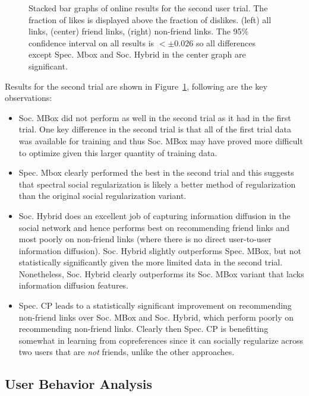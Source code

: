 \begin{figure}[t!]
\caption{Stacked bar graphs of online results for the second
user trial.  The fraction of likes is displayed above 
the fraction of dislikes.  (left) all links, (center) friend links,
(right) non-friend links. The 95\% confidence interval on all 
results is $< \pm 0.026$ so all differences except Spec. Mbox
and Soc. Hybrid in the center graph are significant. }
\label{fig:online2}
\end{figure}

Results for the second trial are 
shown in Figure~\ref{fig:online2}, following are the key observations:
\begin{itemize}
\item Soc. MBox did not perform as well in the second trial as it had
in the first trial.  One key difference in the second trial is that
all of the first trial data was available for training and thus
Soc. MBox may have proved more difficult to optimize given this larger 
quantity of training data.
\item Spec. Mbox clearly performed the best in the second trial 
and this suggests that spectral social 
regularization is likely a better method of regularization 
than the original social regularization variant.
\item Soc. Hybrid does an excellent job of capturing information diffusion
in the social network and hence performs best on recommending friend
links and most poorly on non-friend links (where there is no direct
user-to-user information diffusion).  Soc. Hybrid slightly outperforms
Spec. MBox, but not statistically significantly given the more limited
data in the second trial.  Nonetheless, 
Soc. Hybrid clearly outperforms its Soc. MBox variant that lacks 
information diffusion features.
\item Spec. CP leads to a statistically significant improvement
on recommending non-friend links over Soc. MBox and Soc. Hybrid,
which perform poorly on recommending non-friend links.  Clearly then
Spec. CP is benefitting somewhat in learning from copreferences
since it can socially regularize across two users that are \emph{not}
friends, unlike the other approaches.
\end{itemize}


\subsection{User Behavior Analysis}

